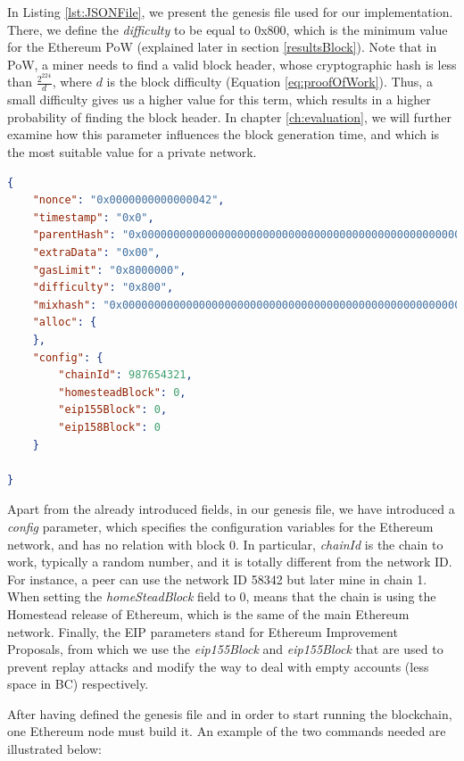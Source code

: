 In Listing \ref{lst:JSONFile}, we present the genesis file used for our implementation. There, we define the \textit{difficulty} to be equal to 0x800, which is the minimum value for the Ethereum PoW (explained later in section \ref{resultsBlock}). Note that in PoW, a miner needs to find a valid block header, whose cryptographic hash is less than $\frac{2^{224}}{d}$, where $d$ is the block difficulty (Equation \ref{eq:proofOfWork}). Thus, a small difficulty gives us a higher value for this term, which results in a higher probability of finding the block header. In chapter \ref{ch:evaluation}, we will further examine how this parameter influences the block generation time, and which is the most suitable value for a private network. 

\begin{lstlisting}[language=JSON,caption={Genesis file used for our implementation.},label={lst:JSONFile}]
{
    "nonce": "0x0000000000000042",
    "timestamp": "0x0",
    "parentHash": "0x0000000000000000000000000000000000000000000000000000000000000000",
    "extraData": "0x00",
    "gasLimit": "0x8000000",
    "difficulty": "0x800",
    "mixhash": "0x0000000000000000000000000000000000000000000000000000000000000000",
    "alloc": {
    },
    "config": {
        "chainId": 987654321,
        "homesteadBlock": 0,
        "eip155Block": 0,
        "eip158Block": 0
    } 

}
\end{lstlisting}

Apart from the already introduced fields, in our genesis file, we have introduced a \textit{config} parameter, which specifies the configuration variables for the Ethereum network, and has no relation with block 0. In particular, \textit{chainId} is the chain to work, typically a random number, and it is totally different from the network ID. For instance, a peer can use the network ID 58342 but later mine in chain 1. When setting the \textit{homeSteadBlock} field to 0, means that the chain is using the Homestead release of Ethereum, which is the same of the main Ethereum network. Finally, the EIP parameters stand for Ethereum Improvement Proposals, from which we use the \textit{eip155Block} and \textit{eip155Block} that are used to prevent replay attacks and modify the way to deal with empty accounts (less space in BC) respectively.

After having defined the genesis file and in order to start running the blockchain, one Ethereum node must build it. An example of the two commands needed are illustrated below:
\newline

